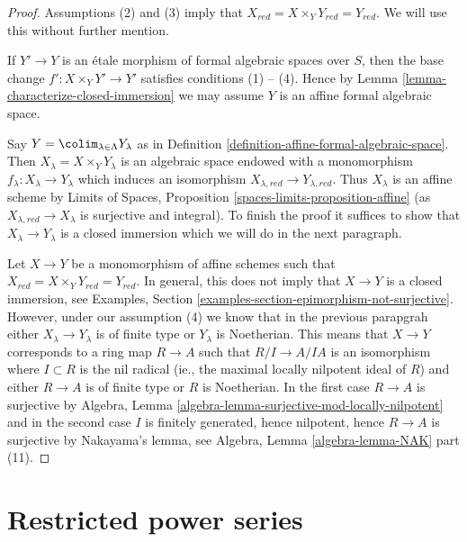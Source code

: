 \begin{proof}
Assumptions (2) and (3) imply that
$X_{red} = X \times_Y Y_{red} = Y_{red}$.
We will use this without further mention.

\medskip\noindent
If $Y' \to Y$ is an \'etale morphism of formal algebraic spaces over $S$,
then the base change $f' : X \times_Y Y' \to Y'$ satisfies conditions
(1) -- (4). Hence by Lemma \ref{lemma-characterize-closed-immersion}
we may assume $Y$ is an affine formal algebraic space.

\medskip\noindent
Say $Y = \colim_{\lambda \in \Lambda} Y_\lambda$ as in
Definition \ref{definition-affine-formal-algebraic-space}.
Then $X_\lambda = X \times_Y Y_\lambda$ is an algebraic space
endowed with a monomorphism $f_\lambda : X_\lambda \to Y_\lambda$
which induces an isomorphism $X_{\lambda, red} \to Y_{\lambda, red}$.
Thus $X_\lambda$ is an affine scheme by
Limits of Spaces, Proposition \ref{spaces-limits-proposition-affine}
(as $X_{\lambda, red} \to X_\lambda$ is surjective and integral).
To finish the proof it suffices to show that
$X_\lambda \to Y_\lambda$ is a closed immersion
which we will do in the next paragraph.

\medskip\noindent
Let $X \to Y$ be a monomorphism of affine schemes such that
$X_{red} = X \times_Y Y_{red} = Y_{red}$. In general, this does
not imply that $X \to Y$ is a closed immersion, see
Examples, Section \ref{examples-section-epimorphism-not-surjective}.
However, under our assumption (4) we know that in the previous parapgrah
either $X_\lambda \to Y_\lambda$ is of finite type or $Y_\lambda$
is Noetherian. This means that
$X \to Y$ corresponds to a ring map $R \to A$ such that
$R/I \to A/IA$ is an isomorphism where $I \subset R$ is the
nil radical (ie., the maximal locally nilpotent ideal of $R$)
and either $R \to A$ is of finite type or $R$ is Noetherian.
In the first case $R \to A$ is surjective by
Algebra, Lemma \ref{algebra-lemma-surjective-mod-locally-nilpotent}
and in the second case $I$ is finitely generated, hence
nilpotent, hence $R \to A$ is surjective by Nakayama's lemma, see
Algebra, Lemma \ref{algebra-lemma-NAK} part (11).
\end{proof}








\section{Restricted power series}
\label{section-restricted-power-series}

